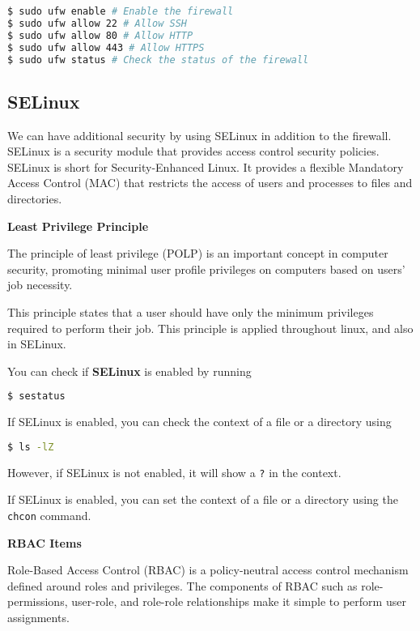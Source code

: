 \begin{lstlisting}[language=bash]
$ sudo ufw enable # Enable the firewall
$ sudo ufw allow 22 # Allow SSH
$ sudo ufw allow 80 # Allow HTTP
$ sudo ufw allow 443 # Allow HTTPS
$ sudo ufw status # Check the status of the firewall
\end{lstlisting}

\subsection{SELinux}

We can have additional security by using SELinux
in addition to the firewall. SELinux is a security
module that provides access control security policies.
SELinux is short for Security-Enhanced Linux.
It provides a flexible Mandatory Access Control (MAC)
that restricts the access of users and processes to
files and directories.

\textbf{Least Privilege Principle}

\begin{definition}
The principle of least privilege (POLP) is an important
concept in computer security, promoting minimal user
profile privileges on computers based on users' job
necessity.
\end{definition}

This principle states that a user should have only
the minimum privileges required to perform their job.
This principle is applied throughout linux, and also
in SELinux.

You can check if \textbf{SELinux} is enabled by running

\begin{lstlisting}[language=bash]
$ sestatus
\end{lstlisting}

If SELinux is enabled, you can check the context of
a file or a directory using

\begin{lstlisting}[language=bash]
$ ls -lZ
\end{lstlisting}

However, if SELinux is not enabled, it will show
a \lstinline|?| in the context.

If SELinux is enabled, you can set the context of a
file or a directory using the \lstinline|chcon| command.

\textbf{RBAC Items}

\begin{definition}
Role-Based Access Control (RBAC) is a policy-neutral
access control mechanism defined around roles and
privileges. The components of RBAC such as role-permissions,
user-role, and role-role relationships make it simple
to perform user assignments.
\end{definition}

